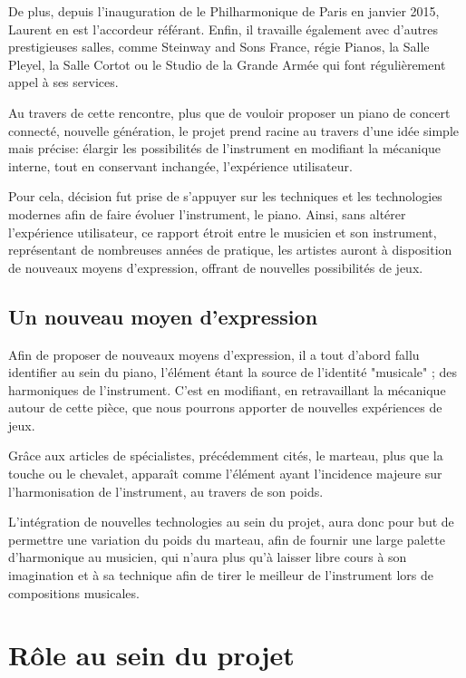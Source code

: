 \documentclass[french,a4paper,12pt]{report}
\begin{document}
	De plus, depuis l'inauguration de le Philharmonique de Paris en janvier 2015, Laurent en est l'accordeur référant. Enfin, il travaille également avec d'autres prestigieuses salles, comme Steinway and Sons France, régie Pianos, la Salle Pleyel, la Salle Cortot ou le Studio de la Grande Armée qui font régulièrement appel à ses services.	
	
	Au travers de cette rencontre, plus que de vouloir proposer un piano de concert connecté, nouvelle génération, le projet prend racine au travers d'une idée simple mais précise: élargir les possibilités de l'instrument en modifiant la mécanique interne, tout en conservant inchangée, l'expérience utilisateur.
	
	Pour cela, décision fut prise de s'appuyer sur les techniques et les technologies modernes afin de faire évoluer l'instrument, le piano.	Ainsi, sans altérer l'expérience utilisateur, ce rapport étroit entre le musicien et son instrument, représentant de nombreuses années de pratique, les artistes auront à disposition de nouveaux moyens d'expression, offrant de nouvelles possibilités de jeux.
	
	\newpage
	
		\subsection{Un nouveau moyen d'expression} %
		
		Afin de proposer de nouveaux moyens d'expression, il a tout d'abord fallu identifier au sein du piano, l'élément étant la source de l'identité "musicale" ; des harmoniques de l'instrument. C'est en modifiant, en retravaillant la mécanique autour de cette pièce, que nous pourrons apporter de nouvelles expériences de jeux.
		
		Grâce aux articles de spécialistes, précédemment cités, le marteau, plus que la touche ou le chevalet, apparaît comme l'élément ayant l'incidence majeure sur l'harmonisation de l'instrument, au travers de son poids.
		
		L'intégration de nouvelles technologies au sein du projet, aura donc pour but de permettre une variation du poids du marteau, afin de fournir une large palette d'harmonique au musicien, qui n'aura plus qu'à laisser libre cours à son imagination et à sa technique afin de tirer le meilleur de l'instrument lors de compositions musicales.
	
	\section{Rôle au sein du projet}	
	
\end{document}
